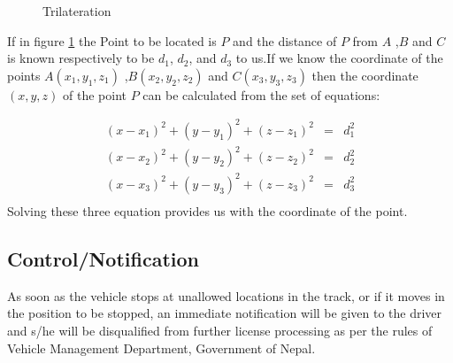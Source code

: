 \begin{figure}[htpb]
	\centering
	\caption{Trilateration}
	\label{fig:Trilateration}
\end{figure}
If in figure \ref{fig:Trilateration} the Point to be located is $P$ and the distance of $P$ from $A$ ,$B$ and $C$ is known respectively to be $d_1$, $d_2$, and $d_3$ to us.If we know the coordinate of the points $A(x_1,y_1,z_1)$ ,$B(x_2,y_2,z_2)$ and $C(x_3,y_3,z_3)$ then the coordinate $(x,y,z)$ of the point $P$ can be calculated from the set of equations:

\begin{eqnarray*}
	(x-x_1)^2+(y-y_1)^2+(z-z_1)^2 &=& d_1^2\\
	(x-x_2)^2+(y-y_2)^2+(z-z_2)^2 &=& d_2^2\\
	(x-x_3)^2+(y-y_3)^2+(z-z_3)^2 &=& d_3^2\\			
\end{eqnarray*} 
	Solving these three equation provides us with the coordinate of the point.
	\subsection{Control/Notification}
		As soon as the vehicle stops at unallowed locations in the track, or if it moves in the position to be stopped, an immediate notification will be given to the driver and s/he will be disqualified from further license processing as per the rules of Vehicle Management Department, Government of Nepal.

